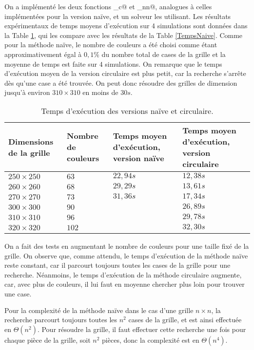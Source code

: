 \documentclass[a4paper,12pt]{article}
\numberwithin{equation}{section}
\begin{document}
On a implémenté les deux fonctions \verb@RechercheCaseCirculaire_c@ et \verb@Recherche@\allowbreak\verb@CaseCirculaire_nn@, analogues à celles implémentées pour la version naïve, et un solveur les utilisant. Les résultats expérimentaux de temps moyens d'exécution sur 4 simulations sont données dans la Table \ref{TempsCirculaire}, qui les compare avec les résultats de la Table \ref{TempsNaive}. Comme pour la méthode naïve, le nombre de couleurs a été choisi comme étant approximativement égal à $0,1\%$ du nombre total de cases de la grille et la moyenne de temps est faite sur 4 simulations. On remarque que le temps d'exécution moyen de la version circulaire est plus petit, car la recherche s'arrête dès qu'une case a été trouvée. On peut donc résoudre des grilles de dimension jusqu'à environ $310 \times 310$ en moins de $30 s$.

\begin{table}[ht]
\centering
\begin{tabular}{>{\centering} m{} >{\centering} m{} >{\centering} m{} >{\centering} m{}}
\hline\hline
Dimensions de la grille & Nombre de couleurs & Temps moyen d'exécution, version naïve & Temps moyen d'exécution, version circulaire \tabularnewline
\hline
$250 \times 250$ &  $63$ & $22,94 s$ & $12,38 s$ \tabularnewline
$260 \times 260$ &  $68$ & $29,29 s$ & $13,61 s$ \tabularnewline
$270 \times 270$ &  $73$ & $31,36 s$ & $17,34 s$ \tabularnewline
$300 \times 300$ &  $90$ &           & $26,89 s$ \tabularnewline
$310 \times 310$ &  $96$ &           & $29,78 s$ \tabularnewline
$320 \times 320$ & $102$ &           & $32,30 s$ \tabularnewline
\hline\hline
\end{tabular}
\caption{Temps d'exécution des versions naïve et circulaire.}
\label{TempsCirculaire}
\end{table}

On a fait des tests en augmentant le nombre de couleurs pour une taille fixé de la grille. On observe que, comme attendu, le temps d'exécution de la méthode naïve reste constant, car il parcourt toujours toutes les cases de la grille pour une recherche. Néanmoins, le temps d'exécution de la méthode circulaire augmente, car, avec plus de couleurs, il lui faut en moyenne chercher plus loin pour trouver une case.

Pour la complexité de la méthode naïve dans le cas d'une grille $n \times n$, la recherche parcourt toujours toutes les $n^2$ cases de la grille, et est ainsi effectuée en $\Theta(n^2)$. Pour résoudre la grille, il faut effectuer cette recherche une fois pour chaque pièce de la grille, soit $n^2$ pièces, donc la complexité est en $\Theta(n^4)$.
\end{document}
